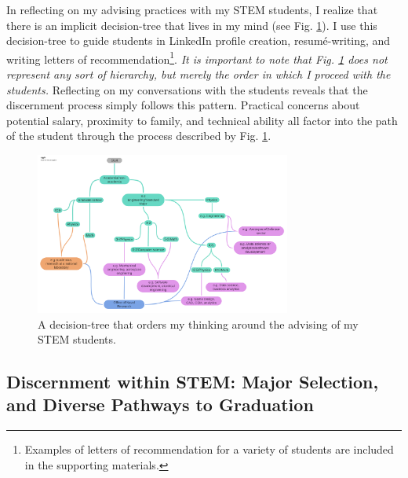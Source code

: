 \documentclass[../../../main.tex]{subfiles}
\begin{document}
In reflecting on my advising practices with my STEM students, I realize that there is an implicit decision-tree that lives in my mind (see Fig. \ref{fig:tree}).  I use this decision-tree to guide students in LinkedIn profile creation, resum\'{e}-writing, and writing letters of recommendation\footnote{Examples of letters of recommendation for a variety of students are included in the supporting materials.}.  \textit{It is important to note that Fig. \ref{fig:tree} does not represent any sort of hierarchy, but merely the order in which I proceed with the students.}  Reflecting on my conversations with the students reveals that the discernment process simply follows this pattern.  Practical concerns about potential salary, proximity to family, and technical ability all factor into the path of the student through the process described by Fig. \ref{fig:tree}.

\begin{figure}
\centering
\includegraphics[width=0.75\textwidth]{figures/Advising_tree.pdf}
\caption{\label{fig:tree} A decision-tree that orders my thinking around the advising of my STEM students.}
\end{figure}

\subsection{Discernment within STEM: Major Selection, and Diverse Pathways to Graduation}
\end{document}
